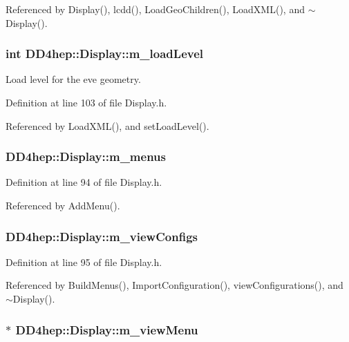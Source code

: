Referenced by Display(), lcdd(), LoadGeoChildren(), LoadXML(), and $\sim$Display().\hypertarget{class_d_d4hep_1_1_display_a82e390dcf9124ff53abd433e9b0bcef5}{
\subsubsection[{m\_\-loadLevel}]{\setlength{\rightskip}{0pt plus 5cm}int {\bf DD4hep::Display::m\_\-loadLevel}}}
\label{class_d_d4hep_1_1_display_a82e390dcf9124ff53abd433e9b0bcef5}


Load level for the eve geometry. 

Definition at line 103 of file Display.h.

Referenced by LoadXML(), and setLoadLevel().\hypertarget{class_d_d4hep_1_1_display_aa6b6e111d83802be4a9a39024cfda066}{
\subsubsection[{m\_\-menus}]{ {\bf DD4hep::Display::m\_\-menus}}}
\label{class_d_d4hep_1_1_display_aa6b6e111d83802be4a9a39024cfda066}


Definition at line 94 of file Display.h.

Referenced by AddMenu().\hypertarget{class_d_d4hep_1_1_display_aaa73b23932af6bf1d1f1e37d621e564c}{
\subsubsection[{m\_\-viewConfigs}]{ {\bf DD4hep::Display::m\_\-viewConfigs}}}
\label{class_d_d4hep_1_1_display_aaa73b23932af6bf1d1f1e37d621e564c}


Definition at line 95 of file Display.h.

Referenced by BuildMenus(), ImportConfiguration(), viewConfigurations(), and $\sim$Display().\hypertarget{class_d_d4hep_1_1_display_a363cb8c67d3fafa5a0847b3ad71dba05}{
\subsubsection[{m\_\-viewMenu}]{$\ast$ {\bf DD4hep::Display::m\_\-viewMenu}}}
\label{class_d_d4hep_1_1_display_a363cb8c67d3fafa5a0847b3ad71dba05}


